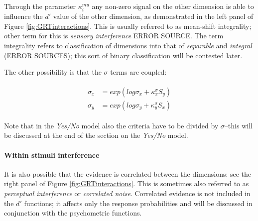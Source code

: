 \documentclass{article}\usepackage{knitr}
\begin{document}
Through the parameter $\kappa_i^{mu}$ any non-zero signal on the other dimension is able to influence the $d'$ value of the other dimension, as demonstrated in the left panel of Figure \ref{fig:GRTinteractions}. This is usually referred to as mean-shift integrality; other term for this is \textit{sensory interference} ERROR SOURCE. The term integrality refers to classification of dimensions into that of \textit{separable} and \textit{integral} (ERROR SOURCES); this sort of binary classification will be contested later.

The other possibility is that the $\sigma$ terms are coupled:

\begin{align}
\label{eq:varshift}
\begin{split}
\sigma_x &= exp(log\sigma_x + \kappa_x^{\sigma} S_y) \\
\sigma_y &= exp(log\sigma_y + \kappa_y^{\sigma} S_x)
\end{split}
\end{align}

Note that in the \textit{Yes/No} model also the criteria have to be divided by $\sigma$--this will be discussed at the end of the section on the \textit{Yes/No} model.

\paragraph{Within stimuli interference}

It is also possible that the evidence is correlated between the dimensions: see the right panel of Figure \ref{fig:GRTinteractions}. This is sometimes also referred to as \textit{perceptual interference} or \textit{correlated noise}. Correlated evidence is not included in the $d'$ functions; it affects only the response probabilities and will be discussed in conjunction with the psychometric functions. 
\end{document}
